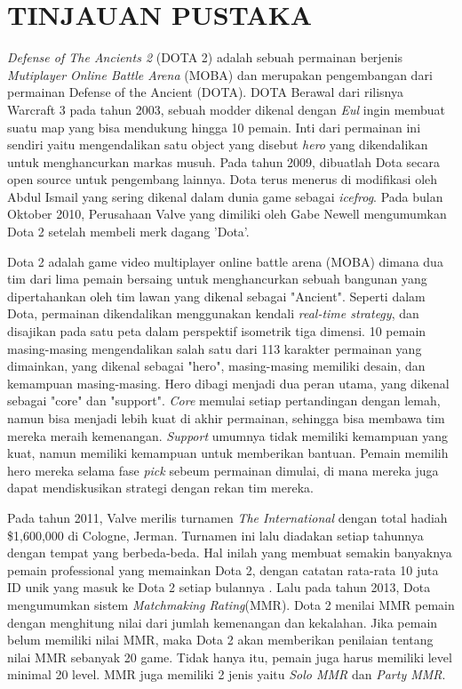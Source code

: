 \documentclass[skripsi]{ugmskripsi}
\begin{document}
\cover

\titlepageind 

\declarepage

\setcounter{chapter}{1}
\chapter{TINJAUAN PUSTAKA}

\setcounter{page}{1}

\emph{Defense of The Ancients 2} (DOTA 2) adalah sebuah permainan berjenis \emph{Mutiplayer Online Battle Arena} (MOBA) dan merupakan pengembangan dari permainan Defense of the Ancient (DOTA). DOTA Berawal dari rilisnya Warcraft 3 pada tahun 2003, sebuah modder dikenal dengan \emph{Eul} ingin membuat suatu map yang bisa mendukung hingga 10 pemain. Inti dari permainan ini sendiri yaitu mengendalikan satu object yang disebut \emph{hero} yang dikendalikan untuk menghancurkan markas musuh. Pada tahun 2009, dibuatlah Dota secara open source untuk pengembang lainnya. Dota terus menerus di modifikasi oleh Abdul Ismail yang sering dikenal dalam dunia game sebagai \emph{icefrog}. Pada bulan Oktober 2010, Perusahaan Valve yang dimiliki oleh Gabe Newell mengumumkan Dota 2 setelah membeli merk dagang 'Dota'. 

Dota 2 adalah game video multiplayer online battle arena (MOBA) dimana dua tim dari lima pemain bersaing untuk menghancurkan sebuah bangunan yang dipertahankan oleh tim lawan yang dikenal sebagai "Ancient". Seperti dalam Dota, permainan dikendalikan menggunakan kendali \emph{real-time strategy}, dan disajikan pada satu peta dalam perspektif isometrik tiga dimensi. 10 pemain masing-masing mengendalikan salah satu dari 113 karakter permainan yang dimainkan, yang dikenal sebagai "hero", masing-masing memiliki desain, dan kemampuan masing-masing. Hero dibagi menjadi dua peran utama, yang dikenal sebagai "core" dan "support". \emph{Core} memulai setiap pertandingan dengan lemah, namun bisa menjadi lebih kuat di akhir permainan, sehingga bisa membawa tim mereka meraih kemenangan. \emph{Support}  umumnya tidak memiliki kemampuan yang kuat, namun memiliki kemampuan untuk memberikan bantuan. Pemain memilih hero mereka selama fase \emph{pick} sebeum permainan dimulai, di mana mereka juga dapat mendiskusikan strategi dengan rekan tim mereka. 

Pada tahun 2011, Valve merilis turnamen \emph{The International} dengan total hadiah \$1,600,000 di Cologne, Jerman. Turnamen ini lalu diadakan setiap tahunnya dengan tempat yang berbeda-beda. Hal inilah yang membuat semakin banyaknya pemain professional yang memainkan Dota 2, dengan catatan rata-rata 10 juta ID unik yang masuk ke Dota 2 setiap bulannya \citep{wdn}. Lalu pada tahun 2013, Dota mengumumkan sistem \emph{Matchmaking Rating}(MMR). Dota 2 menilai MMR pemain dengan menghitung nilai dari jumlah kemenangan dan kekalahan. Jika pemain belum memiliki nilai MMR, maka Dota 2 akan memberikan penilaian tentang nilai MMR sebanyak 20 game. Tidak hanya itu, pemain juga harus memiliki level minimal 20 level. MMR juga memiliki 2 jenis yaitu \emph{Solo MMR} dan \emph{Party MMR}.
\end{document}
